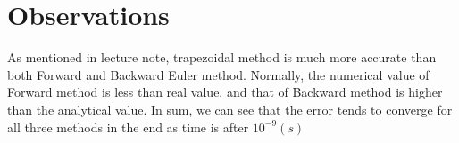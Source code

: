 \documentclass[12pt,a4paper]{book}
\begin{document}
\section{Observations}

As mentioned in lecture note, trapezoidal method is much more accurate than both Forward and Backward Euler method. Normally, the numerical value of Forward method is less than real value, and that of Backward method is higher than the analytical value. In sum, we can see that the error tends to converge for all three methods in the end as time is after $10^{-9}(s)$
\end{document}
